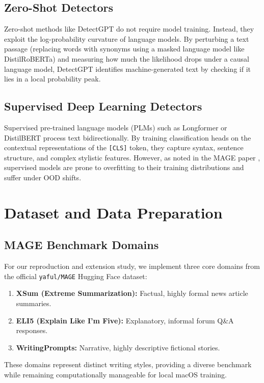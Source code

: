 \documentclass[12pt,a4paper]{report}
\begin{document}
\section{Zero-Shot Detectors}
Zero-shot methods like DetectGPT \cite{mitchell2023detectgpt} do not require model training. Instead, they exploit the log-probability curvature of language models. By perturbing a text passage (replacing words with synonyms using a masked language model like DistilRoBERTa) and measuring how much the likelihood drops under a causal language model, DetectGPT identifies machine-generated text by checking if it lies in a local probability peak.

\section{Supervised Deep Learning Detectors}
Supervised pre-trained language models (PLMs) such as Longformer or DistilBERT \cite{sanh2019distilbert} process text bidirectionally. By training classification heads on the contextual representations of the \texttt{[CLS]} token, they capture syntax, sentence structure, and complex stylistic features. However, as noted in the MAGE paper \cite{li-etal-2024-mage}, supervised models are prone to overfitting to their training distributions and suffer under OOD shifts.

\chapter{Dataset and Data Preparation}
\label{ch:dataset}

\section{MAGE Benchmark Domains}
For our reproduction and extension study, we implement three core domains from the official \texttt{yaful/MAGE} Hugging Face dataset:
\begin{enumerate}
    \item \textbf{XSum (Extreme Summarization):} Factual, highly formal news article summaries.
    \item \textbf{ELI5 (Explain Like I'm Five):} Explanatory, informal forum Q\&A responses.
    \item \textbf{WritingPrompts:} Narrative, highly descriptive fictional stories.
\end{enumerate}
These domains represent distinct writing styles, providing a diverse benchmark while remaining computationally manageable for local macOS training.
\end{document}
